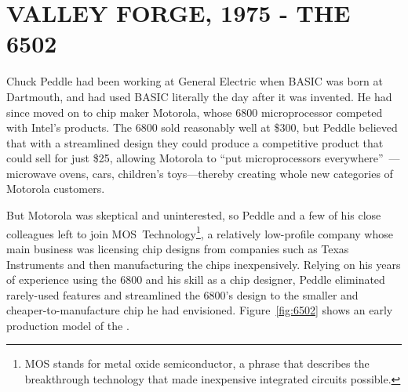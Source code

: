 
\section{VALLEY FORGE, 1975 - THE 6502}


Chuck Peddle had been working at General Electric when BASIC was
born at Dartmouth, and had used BASIC literally the day
after it was invented.
He had since moved on to chip maker Motorola, whose 6800
microprocessor competed with Intel's products.
The 6800 sold reasonably well at \$300, but
Peddle  believed that with a streamlined design they could
produce a competitive product that could sell for just \$25,
allowing Motorola to ``put
microprocessors everywhere''~\cite[p. 31]{commodore}---microwave ovens,
cars, children's toys---thereby creating whole new categories of Motorola customers.

But Motorola was skeptical and uninterested, so Peddle and a few of
his close colleagues left to join MOS~Technology\footnote{MOS stands
for metal oxide semiconductor, a phrase that describes the
breakthrough technology that made inexpensive integrated circuits
possible.}, a relatively low-profile company whose main business was
licensing chip designs from companies such as Texas Instruments and then
manufacturing the chips inexpensively.
Relying on his years of experience using the 6800
and his skill as a chip designer, Peddle eliminated
rarely-used features and streamlined the 6800's design to
the smaller and cheaper-to-manufacture chip
he had envisioned.
Figure~\ref{fig:6502} shows an early production model of the .

